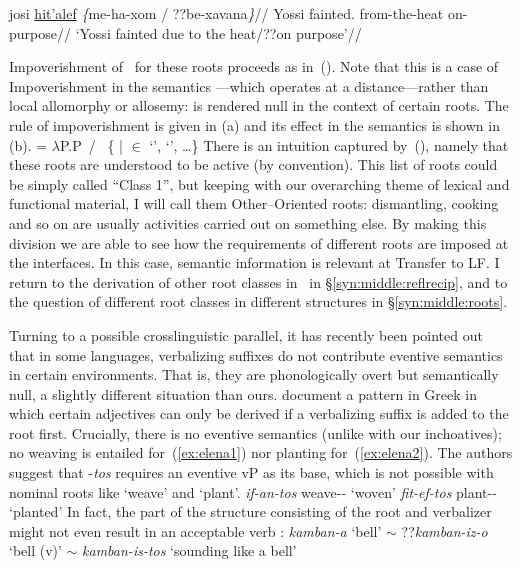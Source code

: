 	\a \label{ex:incho2} \begingl
	\gla josi \underline{hit'alef} \emph{\{}me-ha-xom / ??be-xavana\emph{\}}//
	\glb Yossi fainted. \phantom{\{}from-the-heat {} \phantom{??}on-purpose//
	\glft `Yossi fainted due to the heat/??on purpose'//
	\endgl
\xe

Impoverishment of \va~for these roots proceeds as in~(\nextx). Note that this is a case of Impoverishment in the semantics \citep{nevins15roots}---which operates at a distance---rather than local allomorphy{ or allosemy: {\va} is rendered null in the context of certain roots. The rule of impoverishment is given in} (\nextx a) and its effect in the semantics is shown in (\nextx b).
\pex\label{sem:thit-incho}
	\a \denote{\va~} = $\lambda$P.P~/ \trace~\{ |  $\in$  `',  `', \dots\}
\xe
There is an intuition captured by~(\lastx), namely that these roots are understood to be active (by convention). This list of roots could be simply called ``Class 1'', but keeping with our overarching theme of lexical and functional material, I will call them Other--Oriented roots: dismantling, cooking and so on are usually activities carried out on {something} else. By making this division we are able to see how the requirements of different roots are imposed at the interfaces. In this case, semantic information is relevant at Transfer to LF. I return to the derivation of other root classes in \thit~in \S\ref{syn:middle:reflrecip}, and to the question of different root classes in different structures in \S\ref{syn:middle:roots}.

Turning to a possible crosslinguistic parallel, it has recently been pointed out that in some languages, verbalizing suffixes do not contribute eventive semantics in certain environments. That is, they are phonologically overt but semantically null, a slightly different situation than ours. \citet{elenasamioti13,elenasamioti14} document a pattern in Greek in which certain adjectives can only be derived if a verbalizing suffix is added to the root first. Crucially, there is no eventive semantics (unlike with our inchoatives); no weaving is entailed for~(\ref{ex:elena1}) nor planting for~(\ref{ex:elena2}). {The authors suggest that -\emph{tos} requires an eventive vP as its base, which is not possible with nominal roots like `weave' and `plant'.}
\ex \label{ex:elena1} \emph{if-an-tos} weave-- `woven'
\xe
\ex \label{ex:elena2} \emph{fit-ef-tos} plant-- `planted' \hfill \citep[97]{elenasamioti14}
\xe
In fact, the part of the structure consisting of the root and verbalizer might not even result in an acceptable verb \citep[100]{elenasamioti14}:
\ex \emph{kamban-a} `bell' $\sim$ ??\emph{kamban-iz-o} `bell (v)' $\sim$ \emph{kamban-is-tos} `sounding like a bell'
\xe

